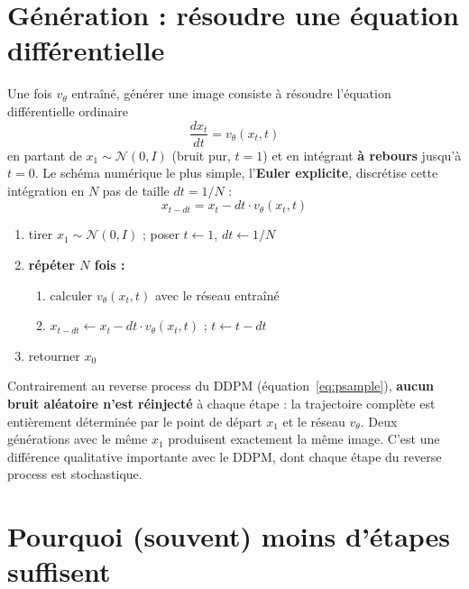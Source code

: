 \section{Génération : résoudre une équation différentielle}

Une fois $v_\theta$ entraîné, générer une image consiste à résoudre l'équation différentielle ordinaire
\begin{equation}
    \frac{dx_t}{dt} = v_\theta(x_t, t)
\end{equation}
en partant de $x_1 \sim \mathcal{N}(0, I)$ (bruit pur, $t=1$) et en intégrant \textbf{à rebours}
jusqu'à $t=0$. Le schéma numérique le plus simple, l'\textbf{Euler explicite}, discrétise cette
intégration en $N$ pas de taille $dt = 1/N$ :
\begin{equation}
    x_{t - dt} = x_t - dt \cdot v_\theta(x_t, t)
\end{equation}

\begin{codebox}[title=Algorithme : Génération par Flow Matching (Euler explicite)]
\begin{enumerate}[nosep]
    \item tirer $x_1 \sim \mathcal{N}(0, I)$ ; poser $t \leftarrow 1$, $dt \leftarrow 1/N$
    \item \textbf{répéter $N$ fois :}
    \begin{enumerate}[nosep]
        \item calculer $v_\theta(x_t, t)$ avec le réseau entraîné
        \item $x_{t-dt} \leftarrow x_t - dt \cdot v_\theta(x_t, t)$ ; $t \leftarrow t - dt$
    \end{enumerate}
    \item retourner $x_0$
\end{enumerate}
\end{codebox}

\begin{remarque}
Contrairement au reverse process du DDPM (équation~\eqref{eq:psample}), \textbf{aucun bruit aléatoire
n'est réinjecté} à chaque étape : la trajectoire complète est entièrement déterminée par le point de
départ $x_1$ et le réseau $v_\theta$. Deux générations avec le même $x_1$ produisent exactement la
même image. C'est une différence qualitative importante avec le DDPM, dont chaque étape du reverse
process est stochastique.
\end{remarque}

\section{Pourquoi (souvent) moins d'étapes suffisent}

